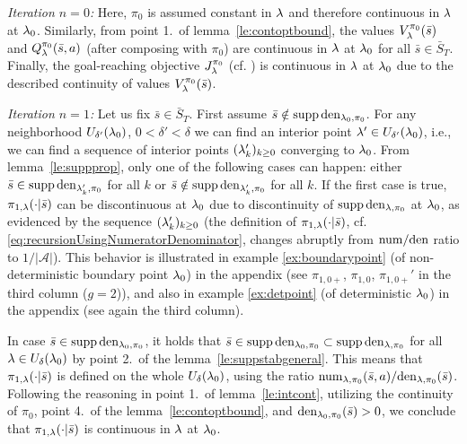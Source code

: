 \emph{Iteration $n=0$:}
Here, $\pi_0$ is assumed constant in $\mathit{\lambda}$ and therefore continuous in $\mathit{\lambda}$ at $\mathit{\lambda}_0$. Similarly, from point 1.\ of lemma~\ref{le:contoptbound}, the values $V_{\mathit{\lambda}}^{\pi_0}(\bar{s})$ and $Q_{\mathit{\lambda}}^{\pi_0}(\bar{s},a)$ (after composing with $\pi_0$) are continuous in $\mathit{\lambda}$ at $\mathit{\lambda}_0$ for all $\bar{s}\in\bar{S}_T$. Finally, the goal-reaching objective $J_{\mathit{\lambda}}^{\pi_0}$ (cf. ) is continuous in  $\mathit{\lambda}$ at $\mathit{\lambda}_0$ due to the described continuity of values $V_{\mathit{\lambda}}^{\pi_0}(\bar{s})$. 

\emph{Iteration $n=1$:}
Let us fix $\bar{s}\in\bar{S}_T$.
First assume $\bar{s}\notin \operatorname*{\mathrm{supp}}\mathrm{den}_{\mathit{\lambda}_0,\pi_0}$.
For any neighborhood $U_{\delta'}(\mathit{\lambda}_0)$, $0<\delta'<\delta$ we can find an interior point $\mathit{\lambda}' \in U_{\delta'}(\mathit{\lambda}_0)$, i.e., we can find a sequence of interior points $(\mathit{\lambda}_{k}')_{k\geq 0}$ converging to $\mathit{\lambda}_0$. From lemma~\ref{le:suppprop}, only one of the following cases can happen: either $\bar{s}\in \operatorname*{\mathrm{supp}}\mathrm{den}_{\mathit{\lambda}_{k}',\pi_0}$ for all $k$ or $\bar{s}\notin \operatorname*{\mathrm{supp}}\mathrm{den}_{\mathit{\lambda}_{k}',\pi_0}$ for all $k$.
If the first case is true, $\pi_{1,\mathit{\lambda}}(\cdot|\bar{s})$ can be discontinuous at $\mathit{\lambda}_0$ due to discontinuity of $\operatorname*{\mathrm{supp}} \mathrm{den}_{\mathit{\lambda},\pi_0}$ at $\mathit{\lambda}_0$, as evidenced by the sequence $(\mathit{\lambda}_{k}')_{k\geq 0}$ (the definition of $\pi_{1,\mathit{\lambda}}(\cdot|\bar{s})$, cf. \ref{eq:recursionUsingNumeratorDenominator}, changes abruptly from $\mathrm{num}/\mathrm{den}$ ratio to $1/|\mathcal{A}|$).
This behavior is illustrated in example \ref{ex:boundarypoint} (of non-deterministic boundary point $\mathit{\lambda}_0$) in the appendix (see $\pi_{1,0+}$, $\pi_{1,0}$, $\pi_{1,0+}'$ in the third column ($g=2$)),
and also in example \ref{ex:detpoint} (of deterministic $\mathit{\lambda}_0$) in the appendix (see again the third column).



In case $\bar{s}\in\operatorname*{\mathrm{supp}}\mathrm{den}_{\mathit{\lambda}_0,\pi_0}$,
it holds that $\bar{s}\in\operatorname*{\mathrm{supp}}\mathrm{den}_{\mathit{\lambda}_0,\pi_0} \subset \operatorname*{\mathrm{supp}}\mathrm{den}_{\mathit{\lambda},\pi_0}$ for all $\mathit{\lambda}\in U_{\delta}(\mathit{\lambda}_0)$ by point 2.\ of the lemma~\ref{le:suppstabgeneral}.
This means that $\pi_{1,\mathit{\lambda}}(\cdot|\bar{s})$ is defined on the whole $U_{\delta}(\mathit{\lambda}_0)$, using the ratio $\mathrm{num}_{\mathit{\lambda},\pi_0}(\bar{s},a)/\mathrm{den}_{\mathit{\lambda},\pi_0}(\bar{s})$. Following the reasoning in point 1.\ of lemma~\ref{le:intcont}, utilizing the continuity of $\pi_0$, point 4.\ of the lemma~\ref{le:contoptbound}, and $\mathrm{den}_{\mathit{\lambda}_0,\pi_0}(\bar{s})>0$, we conclude that $\pi_{1,\mathit{\lambda}}(\cdot|\bar{s})$ is continuous in $\mathit{\lambda}$ at $\mathit{\lambda}_0$.

